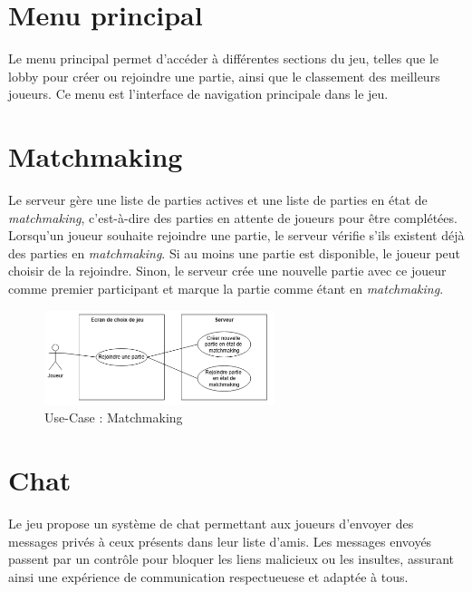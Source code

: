 \documentclass{report}
\begin{document}
\section{Menu principal}

\noindent Le menu principal permet d'accéder à différentes sections du jeu, telles que le lobby pour créer ou rejoindre une partie, ainsi que le classement des meilleurs joueurs. Ce menu est l'interface de navigation principale dans le jeu.

\section{Matchmaking}

\noindent Le serveur gère une liste de parties actives et une liste de parties en état de \emph{matchmaking}, c’est-à-dire des parties en attente de joueurs pour être complétées. Lorsqu'un joueur souhaite rejoindre une partie, le serveur vérifie s'ils existent déjà des parties en \emph{matchmaking}. Si au moins une partie est disponible, le joueur peut choisir de la rejoindre. Sinon, le serveur crée une nouvelle partie avec ce joueur comme premier participant et marque la partie comme étant en \emph{matchmaking}.

\vspace{-1em}

\begin{figure}[H]
    \centering
     \includegraphics[width=0.6\textwidth, keepaspectratio]{src/design/matchmaking.png}
    \caption{Use-Case : Matchmaking}
    \label{fig:use_case_matchmaking}
\end{figure}

\section{Chat}

\noindent Le jeu propose un système de chat permettant aux joueurs d'envoyer des messages privés à ceux présents dans leur liste d'amis. Les messages envoyés passent par un contrôle pour bloquer les liens malicieux ou les insultes, assurant ainsi une expérience de communication respectueuese et adaptée à tous.
\end{document}
